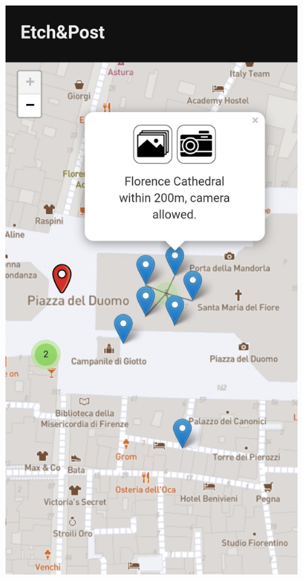 \documentclass{beamer}
\begin{document}
\begin{frame}
\begin{columns}
\begin{itemize}
		\begin{figure}[!h]
 			\centering
 			\includegraphics[scale=0.1]{"Immagini/double.jpg"}
 		\end{figure}
\end{itemize}
\end{columns}
\end{frame}
\end{document}
